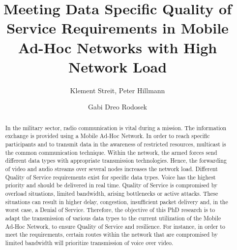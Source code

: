 \documentclass[runningheads]{llncs}
\begin{document}
\title{Meeting Data Specific Quality of Service Requirements in Mobile Ad-Hoc Networks with High Network Load}
%
\author{Klement Streit, Peter Hillmann \and Gabi Dreo Rodosek
}
%
%
%

\maketitle              %

\begin{abstract}
 In the military sector, radio communication is vital during a mission. The information exchange is provided using a Mobile Ad-Hoc Network. In order to reach specific participants and to transmit data in the awareness of restricted resources, multicast is the common communication technique. Within the network, the armed forces send different data types with appropriate transmission technologies. Hence, the forwarding of video and audio streams over several nodes increases the network load. Different Quality of Service requirements exist for specific data types. Voice has the highest priority and should be delivered in real time. Quality of Service is compromised by overload situations, limited bandwidth, arising bottlenecks or active attacks. These situations can result in higher delay, congestion, insufficient packet delivery and, in the worst case, a Denial of Service. Therefore, the objective of this PhD research is to adapt the transmission of various data types to the current utilization of the Mobile Ad-Hoc Network, to ensure Quality of Service and resilience. For instance, in order to meet the requirements, certain routes within the network that are compromised by limited bandwidth will prioritize transmission of voice over video.

\end{abstract}
%
\end{document}

